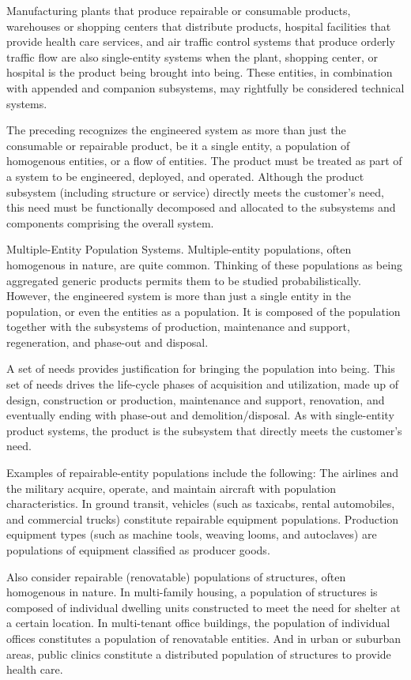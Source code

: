 Manufacturing plants that produce repairable or consumable products, warehouses or shopping centers that distribute products, hospital facilities that provide health care services, and air traffic control systems that produce orderly traffic flow are also single-entity systems when the plant, shopping center, or hospital is the product being brought into being. These entities, in combination with appended and companion subsystems, may rightfully be considered technical systems.

The preceding recognizes the engineered system as more than just the consumable or repairable product, be it a single entity, a population of homogenous entities, or a flow of entities. The product must be treated as part of a system to be engineered, deployed, and operated. Although the product subsystem (including structure or service) directly meets the customer’s need, this need must be functionally decomposed and allocated to the subsystems and components comprising the overall system.

Multiple-Entity Population Systems. Multiple-entity populations, often homogenous in nature, are quite common. Thinking of these populations as being aggregated generic products permits them to be studied probabilistically. However, the engineered system is more than just a single entity in the population, or even the entities as a population. It is composed of the population together with the subsystems of production, maintenance and support, regeneration, and phase-out and disposal.

A set of needs provides justification for bringing the population into being. This set of needs drives the life-cycle phases of acquisition and utilization, made up of design, construction or production, maintenance and support, renovation, and eventually ending with phase-out and demolition/disposal. As with single-entity product systems, the product is the subsystem that directly meets the customer’s need.

Examples of repairable-entity populations include the following: The airlines and the military acquire, operate, and maintain aircraft with population characteristics. In ground transit, vehicles (such as taxicabs, rental automobiles, and commercial trucks) constitute repairable equipment populations. Production equipment types (such as machine tools, weaving looms, and autoclaves) are populations of equipment classified as producer goods.

Also consider repairable (renovatable) populations of structures, often homogenous in nature. In multi-family housing, a population of structures is composed of individual dwelling units constructed to meet the need for shelter at a certain location. In multi-tenant office buildings, the population of individual offices constitutes a population of renovatable entities. And in urban or suburban areas, public clinics constitute a distributed population of structures to provide health care.

